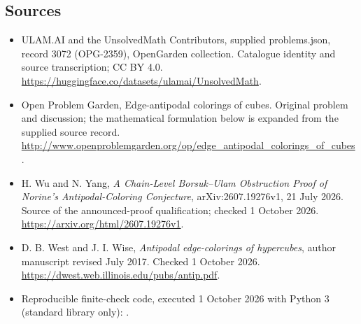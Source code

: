 \documentclass[11pt,a4paper]{article}
\begin{document}
\subsection{Sources}
\begin{itemize}
\item[S1] ULAM.AI and the UnsolvedMath Contributors, supplied problems.json, record 3072 (OPG-2359), OpenGarden collection. Catalogue identity and source transcription; CC BY 4.0.
\url{https://huggingface.co/datasets/ulamai/UnsolvedMath}.
\item[S2] Open Problem Garden, Edge-antipodal colorings of cubes. Original problem and discussion; the mathematical formulation below is expanded from the supplied source record.
\url{http://www.openproblemgarden.org/op/edge_antipodal_colorings_of_cubes}.
\item[S3] H. Wu and N. Yang, \emph{A Chain-Level Borsuk--Ulam Obstruction Proof of Norine's Antipodal-Coloring Conjecture}, arXiv:2607.19276v1, 21 July 2026. Source of the announced-proof qualification; checked 1 October 2026.
\url{https://arxiv.org/html/2607.19276v1}.
\item[S4] D. B. West and J. I. Wise, \emph{Antipodal edge-colorings of hypercubes}, author manuscript revised July 2017. Checked 1 October 2026.
\url{https://dwest.web.illinois.edu/pubs/antip.pdf}.
\item[C1] Reproducible finite-check code, executed 1 October 2026 with Python 3 (standard library only):
.
\end{itemize}
\end{document}
